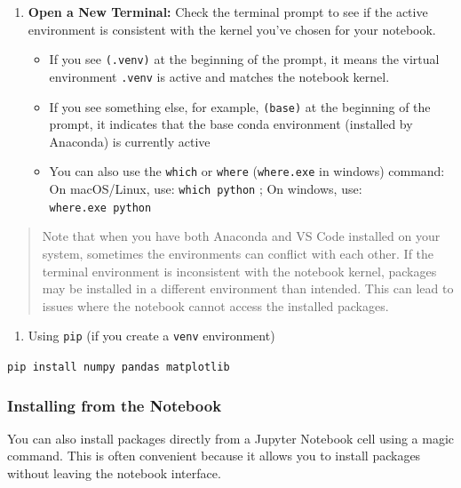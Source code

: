 \documentclass[
  letterpaper,
  DIV=11,
  numbers=noendperiod]{scrreprt}
\providecommand{\tightlist}{%
  \setlength{\itemsep}{0pt}\setlength{\parskip}{0pt}}\usepackage{longtable,booktabs,array}
\begin{document}
\begin{enumerate}
\def\labelenumi{\arabic{enumi}.}
\tightlist
\item
  \textbf{Open a New Terminal:} Check the terminal prompt to see if the
  active environment is consistent with the kernel you've chosen for
  your notebook.

  \begin{itemize}
  \tightlist
  \item
    If you see \texttt{(.venv)} at the beginning of the prompt, it means
    the virtual environment \texttt{.venv} is active and matches the
    notebook kernel.
  \item
    If you see something else, for example, \texttt{(base)} at the
    beginning of the prompt, it indicates that the base conda
    environment (installed by Anaconda) is currently active
  \item
    You can also use the \texttt{which} or \texttt{where}
    (\texttt{where.exe} in windows) command: On macOS/Linux, use:
    \texttt{which\ python} ; On windows, use: \texttt{where.exe\ python}
  \end{itemize}
\end{enumerate}

\begin{quote}
Note that when you have both Anaconda and VS Code installed on your
system, sometimes the environments can conflict with each other. If the
terminal environment is inconsistent with the notebook kernel, packages
may be installed in a different environment than intended. This can lead
to issues where the notebook cannot access the installed packages.
\end{quote}

\begin{enumerate}
\def\labelenumi{\arabic{enumi}.}
\setcounter{enumi}{1}
\tightlist
\item
  Using \texttt{pip} (if you create a \texttt{venv} environment)
\end{enumerate}

\texttt{pip\ install\ numpy\ pandas\ matplotlib}

\hypertarget{installing-from-the-notebook}{%
\subsubsection{Installing from the
Notebook}\label{installing-from-the-notebook}}

You can also install packages directly from a Jupyter Notebook cell
using a magic command. This is often convenient because it allows you to
install packages without leaving the notebook interface.
\end{document}
